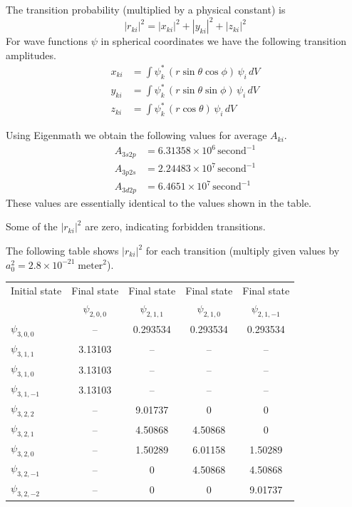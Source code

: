 \documentclass[12pt]{article}
\begin{document}
The transition probability (multiplied by a physical constant) is
\begin{equation*}
|r_{ki}|^2
=|x_{ki}|^2
+|y_{ki}|^2
+|z_{ki}|^2
\end{equation*}
For wave functions $\psi$ in spherical coordinates we have the following transition amplitudes.
\begin{align*}
x_{ki}&=\int\psi_k^*\,(r\sin\theta\cos\phi)\,\psi_i\,dV
\\
y_{ki}&=\int\psi_k^*\,(r\sin\theta\sin\phi)\,\psi_i\,dV
\\
z_{ki}&=\int\psi_k^*\,(r\cos\theta)\,\psi_i\,dV
\end{align*}

Using Eigenmath we obtain the following values for average $A_{ki}$.
\begin{align*}
A_{3s2p}&=6.31358\times10^6\,\text{second}^{-1}
\\
A_{3p2s}&=2.24483\times10^7\,\text{second}^{-1}
\\
A_{3d2p}&=6.4651\times10^7\,\text{second}^{-1}
\end{align*}
These values are essentially identical to the values shown in the table.

\bigskip
Some of the $|r_{ki}|^2$ are zero, indicating forbidden transitions.

\bigskip
The following table shows $|r_{ki}|^2$ for each transition
(multiply given values by $a_0^2=2.8\times10^{-21}\;\text{meter}^2$).

\begin{center}
\begin{tabular}{|l|c|c|c|c|}
\hline
Initial state & Final state & Final state & Final state & Final state
\\
& $\psi_{2,0,0}$ & $\psi_{2,1,1}$ & $\psi_{2,1,0}$ & $\psi_{2,1,-1}$
\\[1ex]
\hline
$\psi_{3,0,0}$ & -- & 0.293534 & 0.293534 & 0.293534
\\
\hline
$\psi_{3,1,1}$ & 3.13103 & -- & -- & --
\\
$\psi_{3,1,0}$ & 3.13103 & -- & -- & --
\\
$\psi_{3,1,-1}$ & 3.13103 & -- & -- & --
\\
\hline
$\psi_{3,2,2}$ & -- & 9.01737 & 0 & 0
\\
$\psi_{3,2,1}$ & -- & 4.50868 & 4.50868 & 0
\\
$\psi_{3,2,0}$ & -- & 1.50289 & 6.01158 & 1.50289
\\
$\psi_{3,2,-1}$ & -- & 0 & 4.50868 & 4.50868
\\
$\psi_{3,2,-2}$ & -- & 0 & 0 & 9.01737
\\
\hline
\end{tabular}
\end{center}
\end{document}
